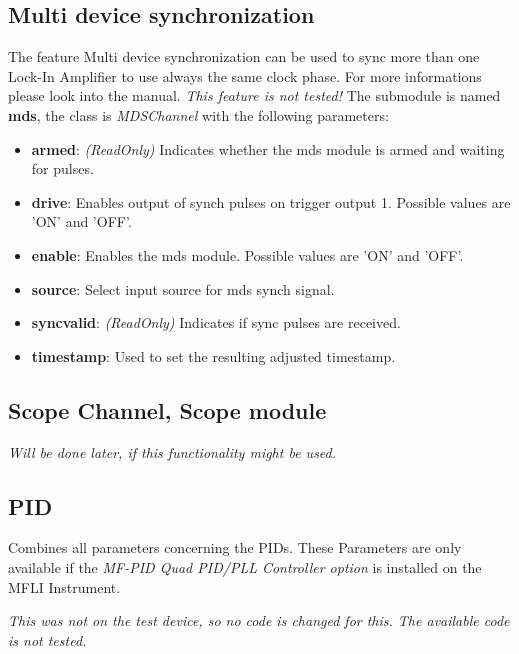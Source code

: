 \documentclass[11pt]{article} %
\begin{document}
\subsection{Multi device synchronization}
The feature Multi device synchronization can be used to sync more than one Lock-In Amplifier to use always the same clock phase. For more informations please look into the manual. {\it This feature is not tested!} The submodule is named {\bf mds}, the class is {\it MDSChannel} with the following parameters:
\begin{itemize}
\item {\bf armed}: {\it (ReadOnly)} Indicates whether the mds module is armed and waiting for pulses.
\item {\bf drive}: Enables output of synch pulses on trigger output 1. Possible values are 'ON' and 'OFF'.
\item {\bf enable}: Enables the mds module. Possible values are 'ON' and 'OFF'.
\item {\bf source}: Select input source for mds synch signal.
\item {\bf syncvalid}: {\it (ReadOnly)} Indicates if sync pulses are received.
\item {\bf timestamp}: Used to set the resulting adjusted timestamp.
\end{itemize}


\subsection{Scope Channel, Scope module}
        {\it Will be done later, if this functionality might be used.}


\subsection{PID}
Combines all parameters concerning the PIDs. These Parameters are only available if the {\it MF-PID Quad PID/PLL Controller option} is installed on the MFLI Instrument.

{\it This was not on the test device, so no code is changed for this. The available code is not tested.}
\end{document}
